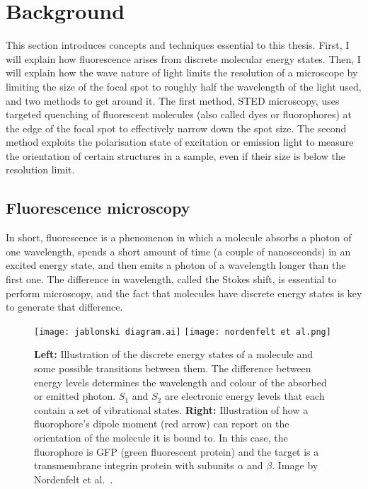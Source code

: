 \chapter{Background}

This section introduces concepts and techniques essential to this thesis. First, I will explain how fluorescence arises from discrete molecular energy states. Then, I will explain how the wave nature of light limits the resolution of a microscope by limiting the size of the focal spot to roughly half the wavelength of the light used, and two methods to get around it. The first method, STED microscopy, uses targeted quenching of fluorescent molecules (also called dyes or fluorophores) at the edge of the focal spot to effectively narrow down the spot size. The second method exploits the polarisation state of excitation or emission light to measure the orientation of certain structures in a sample, even if their size is below the resolution limit.

\section{Fluorescence microscopy}

In short, fluorescence is a phenomenon in which a molecule absorbs a photon of one wavelength, spends a short amount of time (a couple of nanoseconds) in an excited energy state, and then emits a photon of a wavelength longer than the first one. The difference in wavelength, called the Stokes shift, is essential to perform microscopy, and the fact that molecules have discrete energy states is key  to generate that difference.

\begin{figure}
	\centering
	 \texttt{[image: jablonski diagram.ai]} \hfill \texttt{[image: nordenfelt et al.png]}
	\caption{
		\textbf{Left:} Illustration of the discrete energy states of a molecule and some possible transitions between them. The difference between energy levels determines the wavelength and colour of the absorbed or emitted photon. $ S_1 $ and $ S_2 $ are electronic energy levels that each contain a set of vibrational states. \textbf{Right:} Illustration of how a fluorophore's dipole moment (red arrow) can report on the orientation of the molecule it is bound to. In this case, the fluorophore is GFP (green fluorescent protein) and the target is a transmembrane integrin protein with subunits $ \alpha $ and $ \beta $. Image by Nordenfelt et al.~\cite{Nordenfelt2017}.
	}
	\label{fig:jablonski}
\end{figure}

